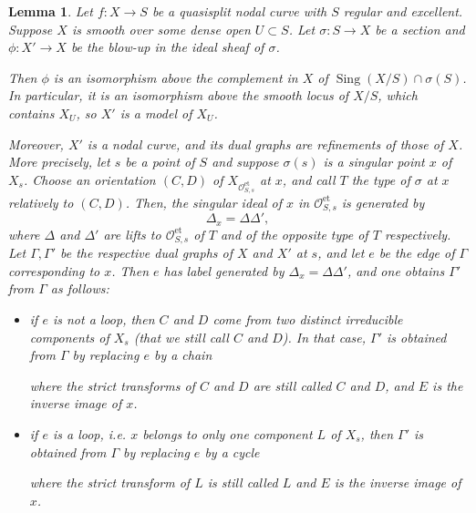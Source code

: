 \documentclass[a4paper,10pt,twoside]{article}
\newcommand{\ra}{\rightarrow}
\newcommand{\on}[1]{\operatorname{#1}}
\renewcommand{\O}{\mathcal{O}}
\DeclareMathOperator{\sing}{Sing}
\newtheorem{lem}[thm]{Lemma}
\theoremstyle{definition}
\theoremstyle{remark}
\renewcommand{\on}[1]{\operatorname{#1}}
\begin{document}
\begin{lem}\label{structure des (C,delta)-blowups}
Let $f:X\ra S$ be a quasisplit nodal curve with $S$ regular and excellent. Suppose $X$ is smooth over some dense open $U\subset S$. Let $\sigma\colon S\to X$ be a section and $\phi\colon X'\to X$ be the blow-up in the ideal sheaf of $\sigma$.

Then $\phi$ is an isomorphism above the complement in $X$ of $\sing(X/S)\cap\sigma(S)$. In particular, it is an isomorphism above the smooth locus of $X/S$, which contains $X_U$, so $X'$ is a model of $X_U$. 

Moreover, $X'$ is a nodal curve, and its dual graphs are refinements of those of $X$. More precisely, let $s$ be a point of $S$ and suppose $\sigma(s)$ is a singular point $x$ of $X_s$. Choose an orientation $(C,D)$ of $X_{\O_{S,s}^{\on{et}}}$ at $x$, and call $T$ the type of $\sigma$ at $x$ relatively to $(C,D)$. Then, the singular ideal of $x$ in $\O_{S,s}^{\on{et}}$ is generated by
\[
\Delta_x=\Delta\Delta',
\]
where $\Delta$ and $\Delta'$ are lifts to $\O_{S,s}^{\on{et}}$ of $T$ and of the opposite type of $T$ respectively. Let $\Gamma,\Gamma'$ be the respective dual graphs of $X$ and $X'$ at $s$, and let $e$ be the edge of $\Gamma$ corresponding to $x$. Then $e$ has label generated by $\Delta_x=\Delta\Delta'$, and one obtains $\Gamma'$ from $\Gamma$ as follows:

\begin{itemize}
\item if $e$ is not a loop, then $C$ and $D$ come from two distinct irreducible components of $X_s$ (that we still call $C$ and $D$). In that case, $\Gamma'$ is obtained from $\Gamma$ by replacing $e$ by a chain

\begin{center}
\end{center}

where the strict transforms of $C$ and $D$ are still called $C$ and $D$, and $E$ is the inverse image of $x$.

\item if $e$ is a loop, i.e. $x$ belongs to only one component $L$ of $X_s$, then $\Gamma'$ is obtained from $\Gamma$ by replacing $e$ by a cycle

\begin{center}
\end{center}

where the strict transform of $L$ is still called $L$ and $E$ is the inverse image of $x$.

\end{itemize}


\end{lem}
\end{document}
